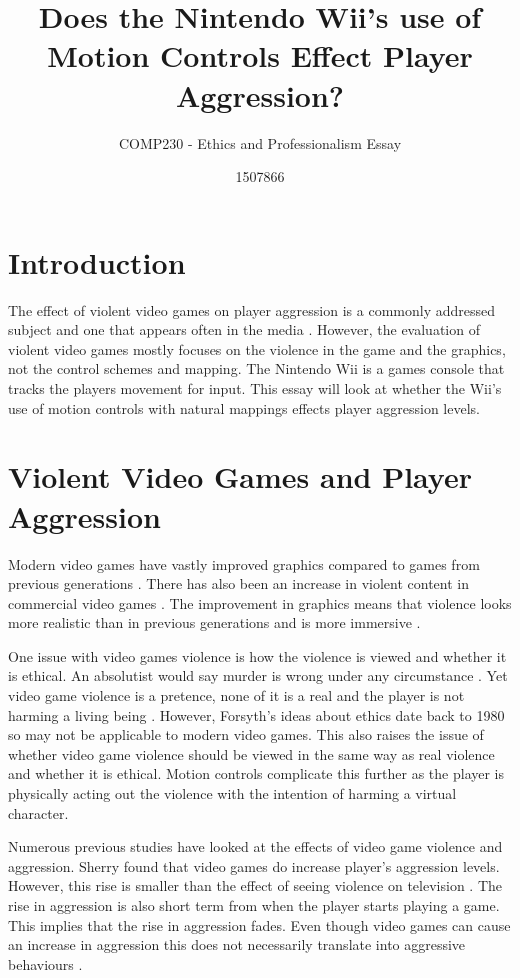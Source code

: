 \documentclass{scrartcl}
\title{ Does the Nintendo Wii's use of Motion Controls Effect Player Aggression? }
\subtitle{COMP230 - Ethics and Professionalism Essay}
\author{1507866}
\begin{document}
	
\maketitle
	
	
\section{Introduction}
The effect of violent video games on player aggression is a commonly addressed subject and one that appears often in the media \cite{DailyMail, GuardianAggression, CBSNews}.
However, the evaluation of violent video games mostly focuses on the violence in the game and the graphics, not the control schemes and mapping.  The Nintendo Wii is a games console that tracks the players movement for input. This essay will look at whether the Wii's use of motion controls with natural mappings effects player aggression levels.

\section{Violent Video Games and Player Aggression} 
Modern video games have vastly improved graphics compared to games from previous generations  \cite{Fumhe}.  There has also been an increase in violent content in commercial video games \cite{Fumhe}. The improvement in graphics means that violence looks more realistic than in previous generations and is more immersive \cite{Kim}.

\bigskip
One issue with video games violence is how the violence is viewed and whether it is ethical. An absolutist would say murder is wrong under any circumstance \cite{forsyth}. 
Yet video game violence is a pretence, none of it is a real and the player is not harming a living being \cite{Tavinor}. 
However, Forsyth's ideas about ethics date back to 1980 so may not be applicable to modern video games. 
This also raises the issue of whether video game violence should be viewed in the same way as real violence and whether it is ethical. 
Motion controls complicate this further as the player is physically acting out the violence with the intention of harming a virtual character. 

\bigskip
Numerous previous studies have looked at the effects of video game violence and aggression.  Sherry found that video games do increase player's aggression levels.  However, this rise is smaller than the effect of seeing violence on television  \cite{sherry2001effects}.
The rise in aggression is also short term from when the player starts playing a game.  This implies that the rise in aggression fades.  Even though video games can cause an increase in aggression this does not necessarily translate into aggressive behaviours \cite{Ferguson}.
\end{document}
